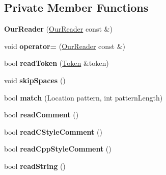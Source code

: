 \subsection*{Private Member Functions}
\begin{DoxyCompactItemize}
\item 
\mbox{\label{classJson_1_1OurReader_aee013005522c0d34d2e14962851487ac}} 
{\bfseries Our\+Reader} (\hyperlink{classJson_1_1OurReader}{Our\+Reader} const \&)
\item 
\mbox{\label{classJson_1_1OurReader_ad418de7c47bd3d0510888e22110b796e}} 
void {\bfseries operator=} (\hyperlink{classJson_1_1OurReader}{Our\+Reader} const \&)
\item 
\mbox{\label{classJson_1_1OurReader_a0d1e66da47fe2e85f5033c59326dfdc3}} 
bool {\bfseries read\+Token} (\hyperlink{classJson_1_1OurReader_1_1Token}{Token} \&token)
\item 
\mbox{\label{classJson_1_1OurReader_a6fbc6d58a4505e5ccadf330b57b17ca5}} 
void {\bfseries skip\+Spaces} ()
\item 
\mbox{\label{classJson_1_1OurReader_a4a03f1b266def9b47c4fef35386557fb}} 
bool {\bfseries match} (Location pattern, int pattern\+Length)
\item 
\mbox{\label{classJson_1_1OurReader_a90f6bb9e55b2bc3d6c1880809495c222}} 
bool {\bfseries read\+Comment} ()
\item 
\mbox{\label{classJson_1_1OurReader_aba784b125baa1b62387e767b791f2f89}} 
bool {\bfseries read\+C\+Style\+Comment} ()
\item 
\mbox{\label{classJson_1_1OurReader_ae3de80671f0f997053e1c1c8a47a45c5}} 
bool {\bfseries read\+Cpp\+Style\+Comment} ()
\item 
\mbox{\label{classJson_1_1OurReader_a5d39b12671499ec5975f3bbc84b7d438}} 
bool {\bfseries read\+String} ()
\item 
\mbox{\label{classJson_1_1OurReader_ac78592defdc333faf56c6d0908758da3}} 

\end{DoxyCompactItemize}
